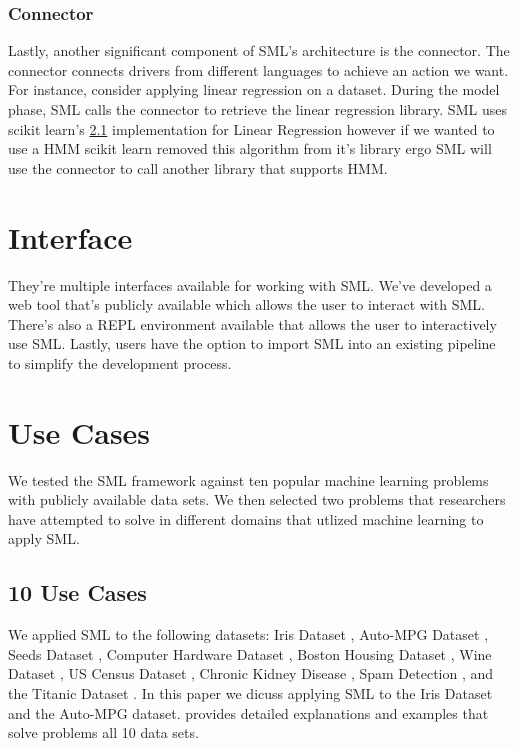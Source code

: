 \documentclass[jair,twoside,11pt,theapa]{article}
\begin{document}
\subsubsection{Connector}
Lastly, another significant component of SML's architecture is the connector. The connector connects drivers from different languages to achieve an action we want. For instance, consider applying  linear regression on a dataset. During the model phase, SML calls the connector to retrieve the linear regression library. SML uses scikit learn's \ref{} implementation for Linear Regression however if we wanted to use a HMM scikit learn removed this algorithm from it's library ergo SML will use the connector to call another library that supports HMM.

\section{Interface}
\label{interface}

They're multiple interfaces available for working with SML. We've developed a web tool that's publicly available which allows the user to interact with SML. There's also a REPL environment available that allows the user to interactively use SML. Lastly, users have the option to import SML into an existing pipeline to simplify the development process.

\section{Use Cases}
\label{use-cases}


We tested the SML framework against ten popular machine learning problems with publicly available data sets. We then selected two problems that researchers have attempted to solve in different domains that utlized machine learning to apply SML. 

\subsection{10 Use Cases}
We applied SML to the following datasets: Iris Dataset \cite{}, Auto-MPG Dataset \cite{}, Seeds Dataset \cite{}, Computer Hardware Dataset \cite{}, Boston Housing Dataset \cite{}, Wine Dataset \cite{}, US Census Dataset \cite{}, Chronic Kidney Disease \cite{}, Spam Detection \cite{}, and the Titanic Dataset \cite{}. In this paper we dicuss applying SML to the Iris Dataset and the Auto-MPG dataset. \cite{Github:DataFlows} provides detailed explanations and examples that solve problems all 10 data sets.
\end{document}
